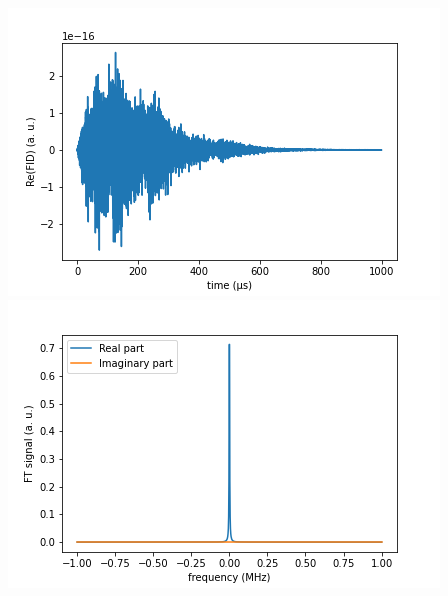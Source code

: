 \documentclass[10pt]{beamer}
\begin{document}
\begin{frame}
$$\begin{columns}[T]
\begin{column}{.5\textwidth}
\begin{column}{.5\textwidth}
\end{column}
\end{column}
\begin{column}{.5\textwidth}
\includegraphics[width=\textwidth]{./spin1-2/23uncorrelated_pure_hyperfine/FIDSignal.png}
\includegraphics[width=\textwidth]{./spin1-2/23uncorrelated_pure_hyperfine/FTSignal.png}
\end{column}
\end{columns}
\end{frame}
\end{document}
